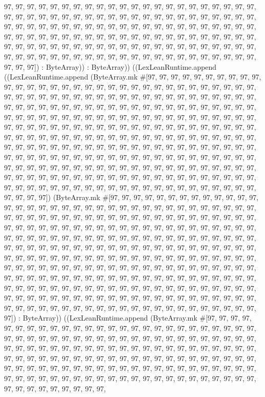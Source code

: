 \documentclass[11pt]{article}
\begin{document}
97, 97, 97, 97, 97, 97, 97, 97, 97, 97, 97, 97, 97, 97, 97, 97, 97, 97, 97, 97, 97, 97, 97, 97, 97, 97, 97, 97, 97, 97, 97, 97, 97, 97, 97, 97, 97, 97, 97, 97, 97, 97, 97, 97, 97, 97, 97, 97, 97, 97, 97, 97, 97, 97, 97, 97, 97, 97, 97, 97, 97, 97, 97, 97, 97, 97, 97, 97, 97, 97, 97, 97, 97, 97, 97, 97, 97, 97, 97, 97, 97, 97, 97, 97, 97, 97, 97, 97, 97, 97, 97, 97, 97, 97, 97, 97, 97, 97, 97, 97, 97, 97, 97, 97, 97, 97, 97, 97, 97, 97, 97, 97, 97, 97, 97, 97, 97, 97, 97, 97, 97, 97, 97, 97, 97, 97, 97, 97, 97, 97, 97, 97, 97, 97, 97]) : ByteArray)) : ByteArray)) ((LexLeanRuntime.append ((LexLeanRuntime.append (ByteArray.mk \#[97, 97, 97, 97, 97, 97, 97, 97, 97, 97, 97, 97, 97, 97, 97, 97, 97, 97, 97, 97, 97, 97, 97, 97, 97, 97, 97, 97, 97, 97, 97, 97, 97, 97, 97, 97, 97, 97, 97, 97, 97, 97, 97, 97, 97, 97, 97, 97, 97, 97, 97, 97, 97, 97, 97, 97, 97, 97, 97, 97, 97, 97, 97, 97, 97, 97, 97, 97, 97, 97, 97, 97, 97, 97, 97, 97, 97, 97, 97, 97, 97, 97, 97, 97, 97, 97, 97, 97, 97, 97, 97, 97, 97, 97, 97, 97, 97, 97, 97, 97, 97, 97, 97, 97, 97, 97, 97, 97, 97, 97, 97, 97, 97, 97, 97, 97, 97, 97, 97, 97, 97, 97, 97, 97, 97, 97, 97, 97, 97, 97, 97, 97, 97, 97, 97, 97, 97, 97, 97, 97, 97, 97, 97, 97, 97, 97, 97, 97, 97, 97, 97, 97, 97, 97, 97, 97, 97, 97, 97, 97, 97, 97, 97, 97, 97, 97, 97, 97, 97, 97, 97, 97, 97, 97, 97, 97, 97, 97, 97, 97, 97, 97, 97, 97, 97, 97, 97, 97, 97, 97, 97, 97, 97, 97, 97, 97, 97, 97, 97, 97, 97, 97, 97, 97, 97, 97, 97, 97, 97, 97, 97, 97, 97, 97, 97, 97, 97, 97, 97, 97, 97, 97, 97, 97, 97, 97, 97, 97, 97, 97, 97, 97, 97, 97, 97, 97, 97, 97, 97, 97, 97, 97, 97, 97, 97, 97, 97, 97, 97, 97, 97, 97, 97, 97, 97, 97]) (ByteArray.mk \#[97, 97, 97, 97, 97, 97, 97, 97, 97, 97, 97, 97, 97, 97, 97, 97, 97, 97, 97, 97, 97, 97, 97, 97, 97, 97, 97, 97, 97, 97, 97, 97, 97, 97, 97, 97, 97, 97, 97, 97, 97, 97, 97, 97, 97, 97, 97, 97, 97, 97, 97, 97, 97, 97, 97, 97, 97, 97, 97, 97, 97, 97, 97, 97, 97, 97, 97, 97, 97, 97, 97, 97, 97, 97, 97, 97, 97, 97, 97, 97, 97, 97, 97, 97, 97, 97, 97, 97, 97, 97, 97, 97, 97, 97, 97, 97, 97, 97, 97, 97, 97, 97, 97, 97, 97, 97, 97, 97, 97, 97, 97, 97, 97, 97, 97, 97, 97, 97, 97, 97, 97, 97, 97, 97, 97, 97, 97, 97, 97, 97, 97, 97, 97, 97, 97, 97, 97, 97, 97, 97, 97, 97, 97, 97, 97, 97, 97, 97, 97, 97, 97, 97, 97, 97, 97, 97, 97, 97, 97, 97, 97, 97, 97, 97, 97, 97, 97, 97, 97, 97, 97, 97, 97, 97, 97, 97, 97, 97, 97, 97, 97, 97, 97, 97, 97, 97, 97, 97, 97, 97, 97, 97, 97, 97, 97, 97, 97, 97, 97, 97, 97, 97, 97, 97, 97, 97, 97, 97, 97, 97, 97, 97, 97, 97, 97, 97, 97, 97, 97, 97, 97, 97, 97, 97, 97, 97, 97, 97, 97, 97, 97, 97, 97, 97, 97, 97, 97, 97, 97, 97, 97, 97, 97, 97, 97, 97, 97, 97, 97, 97, 97, 97, 97, 97, 97, 97]) : ByteArray)) ((LexLeanRuntime.append (ByteArray.mk \#[97, 97, 97, 97, 97, 97, 97, 97, 97, 97, 97, 97, 97, 97, 97, 97, 97, 97, 97, 97, 97, 97, 97, 97, 97, 97, 97, 97, 97, 97, 97, 97, 97, 97, 97, 97, 97, 97, 97, 97, 97, 97, 97, 97, 97, 97, 97, 97, 97, 97, 97, 97, 97, 97, 97, 97, 97, 97, 97, 97, 97, 97, 97, 97, 97, 97, 97, 97, 97, 97, 97, 97, 97, 97, 97, 97, 97, 97, 97, 97, 97, 97, 97, 97, 97, 97, 97, 97, 97, 97, 97, 97, 97, 97, 97, 97, 97, 97, 97, 97, 97, 97, 97, 97, 97, 97, 97, 97, 97, 97, 97, 97, 97, 97, 97, 97, 97, 97, 97, 97, 97, 97, 97, 97, 97, 97, 97, 97, 97, 97, 97, 97, 97, 97, 97, 97, 97, 97, 97, 97, 97, 97, 97, 97, 97, 
\end{document}
